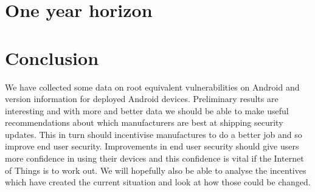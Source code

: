\documentclass[a4paper,twocolumn]{article}
\begin{document}
\section*{One year horizon}



\section*{Conclusion}
We have collected some data on root equivalent vulnerabilities on Android and version information for deployed Android devices.
Preliminary results are interesting and with more and better data we should be able to make useful recommendations about which manufacturers are best at shipping security updates.
This in turn should incentivise manufactures to do a better job and so improve end user security.
Improvements in end user security should give users more confidence in using their devices and this confidence is vital if the Internet of Things is to work out.
We will hopefully also be able to analyse the incentives which have created the current situation and look at how those could be changed.


\printbibliography
\end{document}
